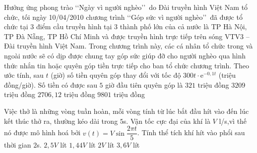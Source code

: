 \begin{ex}%
	Hưởng ứng phong trào \lq\lq  Ngày vì người nghèo\rq\rq\, do Đài truyền hình Việt Nam tổ chức, tối ngày 10/04/2010 chương trình  \lq\lq  Góp sức vì người nghèo\rq\rq\, đã được tổ chức tại $3$ điểm cầu truyền hình tại $3$ thành phố lớn của cả nước là TP Hà Nội, TP Đà Nẵng, TP Hồ Chí Minh và được truyền hình trực tiếp trên sóng VTV3 – Đài truyền hình Việt Nam. Trong chương trình này, các cá nhân tổ chức trong và ngoài nước sẽ có dịp được chung tay góp sức giúp đỡ cho người nghèo qua hình thức nhắn tin hoặc quyên góp tiền trực tiếp cho ban tổ chức chương trình. Theo ước tính, sau $t$ (giờ) số tiền quyên góp thay đổi với tốc độ $300 t\cdot\mathrm{e}^{-0{,}1t}$ (triệu đồng/giờ). Số tiền có được sau $5$ giờ đầu tiên quyên góp là 
	\choice
	{$321$ triệu đồng}
	{$3209$ triệu đồng}
	{\True $2706{,}12$ triệu đồng}
	{$9801$ triệu đồng}
\end{ex}

\begin{ex}%
	Việc thở là những vòng tuần hoàn, mỗi vòng tính từ lúc bắt đầu hít vào đến lúc kết thúc thở ra, thường kéo dài trong $5$s. Vận tốc cực đại của khí là $V$ l/s,vì thế nó được mô hình hoá bởi $v(t)=V\sin \dfrac{2\pi t}{5}$. Tính thể tích khí hít vào phổi sau thời gian $2$s. 
	\choice
	{$2{,}5V$ lít}
	{\True $1{,}44V$ lít}
	{$2V$ lít}
	{$3{,}6V$ lít}
\end{ex}

